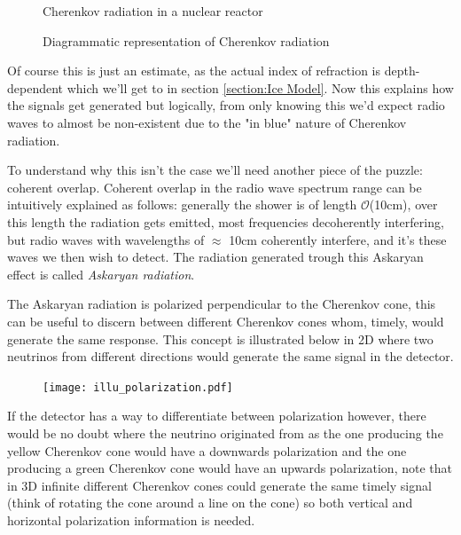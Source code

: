 \begin{figure}
\centering
\begin{minipage}{0.45\textwidth}
	\centering
	\caption{Cherenkov radiation in a nuclear reactor}
	\label{figure: Cherenkov reactor}
\end{minipage}
\hspace{0.05\textwidth}
\begin{minipage}{0.45\textwidth}
	\centering
	\caption{Diagrammatic representation of Cherenkov radiation}
	\label{figure: Cherenkov illustratie}
\end{minipage}
\end{figure}
Of course this is just an estimate, as the actual index of refraction is depth-dependent which
we'll get to in section \ref{section:Ice Model}.
Now this explains how the signals get generated but logically, from only knowing this
we'd expect radio waves to almost be non-existent 
due to the "in blue" nature of Cherenkov radiation. 

To understand why this isn't the case we'll need another piece of the puzzle: coherent overlap.
Coherent overlap in the radio wave spectrum range can be intuitively explained as
follows: generally the shower is of length
$\mathcal{O}$(10cm)\cite{Huege_2017}, over this length the radiation gets
emitted, most frequencies decoherently interfering, but radio waves with wavelengths of 
$\approx$ 10cm coherently interfere, and it's these waves we then wish to detect.
The radiation generated trough this Askaryan effect is called \textit{Askaryan radiation}.

The Askaryan radiation is polarized perpendicular to the
Cherenkov cone, this can be useful to discern between different Cherenkov cones whom,
timely, would generate the same response. This concept is illustrated below in 2D where
two neutrinos from different directions would generate the same signal in the detector.

\begin{figure}[h!]
	\centering
	\texttt{[image: illu\_polarization.pdf]}
\end{figure}

If the detector has a way to differentiate between polarization however, there would be no
doubt where the neutrino originated from as the one producing the yellow Cherenkov cone
would have a downwards polarization and the one producing a green Cherenkov cone would have
an upwards polarization, note that in 3D infinite different Cherenkov cones could generate
the same timely signal (think of rotating the cone around a line on the cone) so both vertical
and horizontal polarization information is needed.


